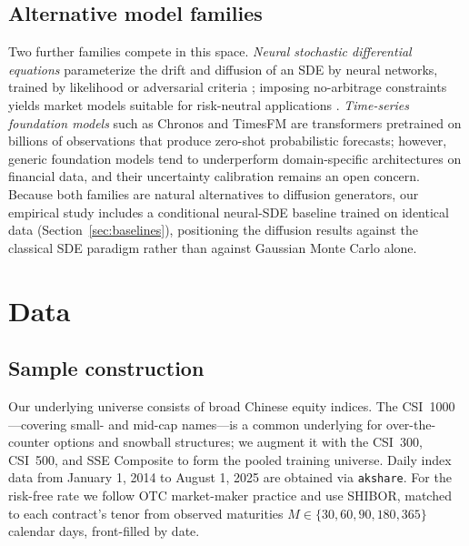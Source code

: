 \documentclass[12pt,letterpaper]{article}
\begin{document}
\subsection{Alternative model families}

Two further families compete in this space. \emph{Neural stochastic
differential equations} parameterize the drift and diffusion of an SDE by
neural networks, trained by likelihood or adversarial criteria
\citep{gierjatowicz2020neural}; imposing no-arbitrage constraints yields
market models suitable for risk-neutral applications
\citep{cohen2023neuralsde}. \emph{Time-series foundation models} such as
Chronos \citep{ansari2024chronos} and TimesFM \citep{das2024timesfm} are
transformers pretrained on billions of observations that produce zero-shot
probabilistic forecasts; however, generic foundation models tend to
underperform domain-specific architectures on financial data, and their
uncertainty calibration remains an open concern. Because both families are
natural alternatives to diffusion generators, our empirical study includes a
conditional neural-SDE baseline trained on identical data
(Section~\ref{sec:baselines}), positioning the diffusion results against the
classical SDE paradigm rather than against Gaussian Monte Carlo alone.

\section{Data}\label{sec:data}

\subsection{Sample construction}

Our underlying universe consists of broad Chinese equity indices. The
CSI~1000---covering small- and mid-cap names---is a common underlying for
over-the-counter options and snowball structures; we augment it with the
CSI~300, CSI~500, and SSE Composite to form the pooled training universe.
Daily index data from January 1, 2014 to August 1, 2025 are obtained via
\texttt{akshare}. For the risk-free rate we follow OTC market-maker practice
and use SHIBOR, matched to each contract's tenor from observed maturities
$M \in \{30, 60, 90, 180, 365\}$ calendar days, front-filled by date.
\end{document}
